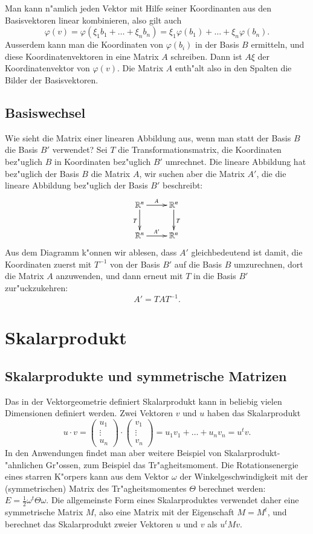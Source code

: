 Man kann n"amlich jeden Vektor mit Hilfe seiner Koordinanten aus
den Basisvektoren linear kombinieren, also gilt auch
\[
\varphi(v)
=
\varphi(\xi_1b_1+\dots+\xi_nb_n)
=
\xi_1\varphi(b_1)+\dots+\xi_n\varphi(b_n).
\]
Ausserdem kann man die Koordinaten von $\varphi(b_i)$ in der Basis
$B$ ermitteln, und diese Koordinatenvektoren in eine Matrix $A$
schreiben.
Dann ist $A\xi$ der Koordinatenvektor von $\varphi(v)$.
Die Matrix $A$ enth"alt also in den Spalten die Bilder der Basisvektoren.

\subsection{Basiswechsel}
Wie sieht die Matrix einer linearen Abbildung aus, wenn man statt
der Basis $B$ die Basis $B'$ verwendet? Sei $T$ die Transformationsmatrix,
die Koordinaten bez"uglich $B$ in Koordinaten bez"uglich $B'$ umrechnet.
Die lineare Abbildung hat bez"uglich der Basis $B$ die Matrix $A$, wir
suchen aber die Matrix $A'$, die die lineare Abbildung bez"uglich der
Basis $B'$ beschreibt:
\[
\xymatrix{
\mathbb R^n\ar[r]^{A} \ar[d]_{T}
	&\mathbb R^n \ar[d]^{T}
\\
\mathbb R^n\ar[r]^{A'}
	&\mathbb R^n
}
\]
Aus dem Diagramm k"onnen wir ablesen, dass $A'$ gleichbedeutend
ist damit, die Koordinaten zuerst mit $T^{-1}$ von der Basis $B'$
auf die Basis $B$ umzurechnen, dort die Matrix $A$ anzuwenden, und
dann erneut mit $T$ in die Basis $B'$ zur"uckzukehren:
\begin{equation}
A'=TAT^{-1}.
\label{abbildung-basiswechsel}
\end{equation}

\section{Skalarprodukt}
\subsection{Skalarprodukte und symmetrische Matrizen}
Das in der Vektorgeometrie definiert Skalarprodukt kann in beliebig
vielen Dimensionen definiert werden.
Zwei Vektoren $v$ und $u$ haben
das Skalarprodukt
\[
u\cdot v=
\begin{pmatrix}u_1\\\vdots\\u_n\end{pmatrix}
\cdot
\begin{pmatrix}v_1\\\vdots\\v_n\end{pmatrix}
=u_1v_1+\dots+u_nv_n=u^tv.
\]
In den Anwendungen findet man aber weitere Beispiel von
Skalarprodukt-"ahnlichen Gr"ossen, zum Beispiel das Tr"agheitsmoment.
Die Rotationsenergie eines starren K"orpers kann aus dem Vektor $\omega$
der Winkelgeschwindigkeit mit der (symmetrischen) Matrix des
Tr"agheitsmomentes $\Theta$
berechnet werden:
$
E=\frac12 \omega^t\Theta \omega.
$
Die allgemeinste Form eines Skalarproduktes verwendet daher eine
symmetrische Matrix $M$, also eine Matrix mit der Eigenschaft
$M=M^t$, und berechnet das Skalarprodukt zweier Vektoren $u$ und $v$
als $u^tMv$.

